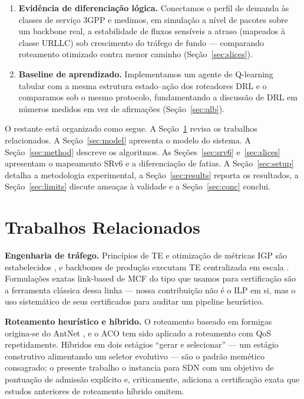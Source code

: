 \documentclass[journal]{IEEEtran}
\begin{document}
\begin{enumerate}
otimizadas para listas de segmentos SRv6 \cite{rfc8402,rfc8754,rfc8986} e
\emph{calculamos} o estado do plano de dados em todas as instâncias,
quantificando a redução frente às regras OpenFlow por fluxo e delimitando o
custo de encapsulamento SRH (Seção~\ref{sec:srv6}).
\item \textbf{Evidência de diferenciação lógica.} Conectamos o perfil de
demanda às classes de serviço 3GPP \cite{itu-m2083,3gpp-ts23501} e medimos,
em simulação a nível de pacotes sobre um backbone real, a estabilidade de
fluxos sensíveis a atraso (mapeados à classe URLLC) sob crescimento do
tráfego de fundo --- comparando roteamento otimizado contra menor caminho
(Seção~\ref{sec:slices}).
\item \textbf{Baseline de aprendizado.} Implementamos um agente de
Q-learning tabular com a mesma estrutura estado--ação dos roteadores DRL e o
comparamos sob o mesmo protocolo, fundamentando a discussão de DRL em
números medidos em vez de afirmações (Seção~\ref{sec:qlb}).
\end{enumerate}

O restante está organizado como segue. A Seção~\ref{sec:related} revisa os
trabalhos relacionados. A Seção~\ref{sec:model} apresenta o modelo do
sistema. A Seção~\ref{sec:method} descreve os algoritmos. As
Seções~\ref{sec:srv6} e~\ref{sec:slices} apresentam o mapeamento SRv6 e a
diferenciação de fatias. A Seção~\ref{sec:setup} detalha a metodologia
experimental, a Seção~\ref{sec:results} reporta os resultados, a
Seção~\ref{sec:limits} discute ameaças à validade e a Seção~\ref{sec:conc}
conclui.

\section{Trabalhos Relacionados}
\label{sec:related}
\textbf{Engenharia de tráfego.} Princípios de TE e otimização de métricas
IGP são estabelecidos \cite{awduche2002,fortz2000}, e backbones de produção
executam TE centralizada em escala \cite{jain2013}. Formulações exatas
link-based de MCF do tipo que usamos para certificação são a ferramenta
clássica dessa linha --- nossa contribuição não é o ILP em si, mas o uso
sistemático de seus certificados para auditar um pipeline heurístico.

\textbf{Roteamento heurístico e híbrido.} O roteamento baseado em formigas
origina-se do AntNet \cite{dicaro1998,dorigo2004}, e o ACO tem sido aplicado a roteamento
com QoS repetidamente. Híbridos em dois estágios ``gerar e selecionar'' --- um
estágio construtivo alimentando um seletor evolutivo --- são o padrão
memético consagrado; o presente trabalho o instancia para SDN com um
objetivo de pontuação de admissão explícito e, criticamente, adiciona a
certificação exata que estudos anteriores de roteamento híbrido omitem.
\end{document}
